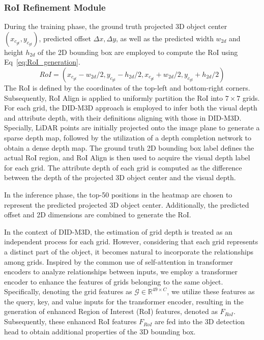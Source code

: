 \documentclass{article}
\begin{document}
\subsubsection{RoI Refinement Module}\label{transformer_module}
During the training phase, the ground truth projected 3D object center $(x_{c_{gt}}, y_{c_{gt}})$, predicted offset $\Delta x, \Delta y$, as well as the predicted width $w_{2d}$ and height $h_{2d} $ of the 2D bounding box are employed to compute the RoI using Eq~\eqref{eq:RoI_generation}.
\begin{equation}
	RoI = (x_{c_{gt}}-w_{2d}/2, y_{c_{gt}}-h_{2d}/2, x_{c_{gt}}+w_{2d}/2, y_{c_{gt}}+h_{2d}/2)
	\label{eq:RoI_generation}
\end{equation}
The RoI is defined by the coordinates of the top-left and bottom-right corners. Subsequently, RoI Align is applied to uniformly partition the RoI into $7\times 7$ grids. For each grid, the DID-M3D approach is employed to infer both the visual depth and attribute depth, with their definitions aligning with those in DID-M3D. Specially, LiDAR points are initially projected onto the image plane to generate a sparse depth map, followed by the utilization of a depth completion network to obtain a dense depth map. The ground truth 2D bounding box label defines the actual RoI region, and RoI Align is then used to acquire the visual depth label for each grid. The attribute depth of each grid is computed as the difference between the depth of the projected 3D object center and the visual depth.

In the inference phase, the top-50 positions in the heatmap are chosen to represent the predicted projected 3D object center. Additionally, the predicted offset and 2D dimensions are combined to generate the RoI.

In the context of DID-M3D, the estimation of grid depth is treated as an independent process for each grid. However, considering that each grid represents a distinct part of the object, it becomes natural to incorporate the relationships among grids. Inspired by the common use of self-attention in transformer encoders to analyze relationships between inputs, we employ a transformer encoder to enhance the features of grids belonging to the same object. Specifically, denoting the grid features as $\mathcal{G} \in {\mathbb{R}}^{49 \times C}$, we utilize these features as the query, key, and value inputs for the transformer encoder, resulting in the generation of enhanced Region of Interest (RoI) features, denoted as $F_{RoI}$. Subsequently, these enhanced RoI features $F_{RoI}$ are fed into the 3D detection head to obtain additional properties of the 3D bounding box.
\end{document}

